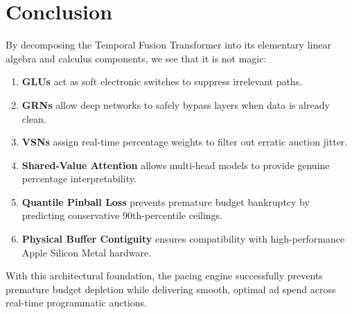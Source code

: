 \documentclass[11pt,a4paper]{article}
\begin{document}
\section{Conclusion}
By decomposing the Temporal Fusion Transformer into its elementary linear algebra and calculus components, we see that it is not magic:
\begin{enumerate}
    \item \textbf{GLUs} act as soft electronic switches to suppress irrelevant paths.
    \item \textbf{GRNs} allow deep networks to safely bypass layers when data is already clean.
    \item \textbf{VSNs} assign real-time percentage weights to filter out erratic auction jitter.
    \item \textbf{Shared-Value Attention} allows multi-head models to provide genuine percentage interpretability.
    \item \textbf{Quantile Pinball Loss} prevents premature budget bankruptcy by predicting conservative 90th-percentile ceilings.
    \item \textbf{Physical Buffer Contiguity} ensures compatibility with high-performance Apple Silicon Metal hardware.
\end{enumerate}
With this architectural foundation, the pacing engine successfully prevents premature budget depletion while delivering smooth, optimal ad spend across real-time programmatic auctions.
\end{document}
